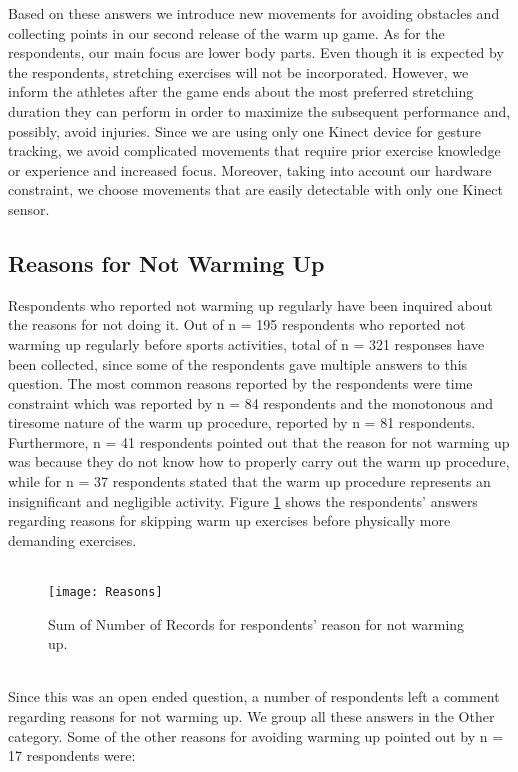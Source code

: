 Based on these answers we introduce new movements for avoiding obstacles and collecting points in our second release of the warm up game. As for the respondents, our main focus are lower body parts. Even though it is expected by the respondents, stretching exercises will not be incorporated. However, we inform the athletes after the game ends about the most preferred stretching duration they can perform in order to maximize the subsequent performance and, possibly, avoid injuries. Since we are using only one Kinect device for gesture tracking, we avoid complicated movements that require prior exercise knowledge or experience and increased focus. Moreover, taking into account our hardware constraint, we choose movements that are easily detectable with only one Kinect sensor. 
\subsection{Reasons for Not Warming Up}
Respondents who reported not warming up regularly have been inquired about the reasons for not doing it.  Out of n = 195 respondents who reported not warming up regularly before sports activities, total of n = 321 responses have been collected, since some of the respondents gave multiple answers to this question. The most common reasons reported by the respondents were time constraint which was reported by n = 84 respondents and the monotonous and tiresome nature of the warm up procedure, reported by n = 81 respondents. Furthermore, n = 41 respondents pointed out that the reason for not warming up was because they do not know how to properly carry out the warm up procedure, while for n = 37 respondents stated that the warm up procedure represents an insignificant and negligible activity. Figure \ref{fig:Reasons} shows the respondents' answers regarding reasons for skipping warm up exercises before physically more demanding exercises.\\\\
\begin{figure}[h]
    \centering
    \texttt{[image: Reasons]}
    \caption{Sum of Number of Records for respondents' reason for not warming up.}
    \label{fig:Reasons}
\end{figure}\\
Since this was an open ended question, a number of respondents left a comment regarding reasons for not warming up. We group all these answers in the Other category. Some of the other reasons for avoiding warming up pointed out by n = 17 respondents were: 
